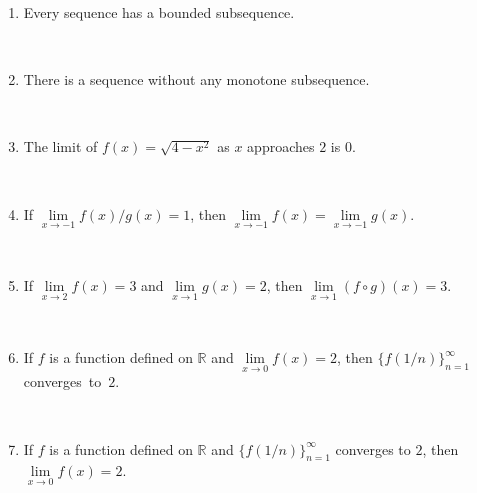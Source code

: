 \documentclass[12pt]{amsart}
\newcommand{\R}{{\mathbb{R}}}
\numberwithin{equation}{section}
\theoremstyle{plain} %
\theoremstyle{definition}
\theoremstyle{remark}
\begin{document}
		
		\begin{enumerate}
		
		
	\item  Every sequence has a bounded subsequence.
	
	\
	
	
	
	\item  There is a sequence without any monotone subsequence.
	
	\
	
	
	
	
	

	
	\item  The limit of $f(x)=\sqrt{4-x^2}$ as $x$ approaches $2$ is $0$.
	
	\
	

	

	\item  If $\lim\limits_{x\to -1} f(x)/g(x) =1$, then $\lim\limits_{x\to -1} f(x)=\lim\limits_{x\to -1} g(x)$.
		
	\
	


	

	 
	 

	 

 
 \item  If $\lim\limits_{x\to 2} f(x) = 3$ and $\lim\limits_{x\to 1} g(x) =2$, then $\lim\limits_{x\to 1} (f \circ g)(x) = 3$.


\
 

 
 	  \item  If $f$ is a function defined on $\R$ and $\lim\limits_{x\to 0} f(x)=2$, then $\{ f(1/n) \}_{n=1}^\infty$ converges~to~$2$.
 
 \
 
 \item  If $f$ is a function defined on $\R$ and $\{ f(1/n) \}_{n=1}^\infty$ converges to $2$, then
 ${\lim\limits_{x\to 0} f(x)=2}$.
 

\end{enumerate}
\end{document}
